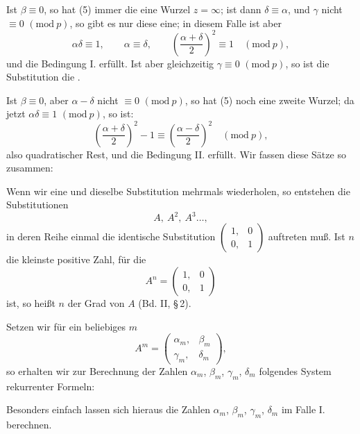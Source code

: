 Ist $\beta \equiv 0$, so hat (5) immer die eine Wurzel $z = \infty$; ist
dann $\delta \equiv \alpha$, und $\gamma$ nicht $\equiv 0$ $(\mathrm{mod}\ p)$, so gibt es nur diese
eine; in diesem Falle ist aber
\[
\alpha\delta \equiv 1, \qquad \alpha \equiv \delta, \qquad \left(\frac{\alpha+\delta}{2}\right)^2 \equiv 1 \quad (\mathrm{mod}\ p),
\]
und die Bedingung I. erfüllt. Ist aber gleichzeitig $\gamma \equiv 0$ $(\mathrm{mod}\ p)$,
so ist die Substitution die .

Ist $\beta \equiv 0$, aber $\alpha-\delta$ nicht $\equiv 0$ $(\mathrm{mod}\ p)$, so hat (5) noch
eine zweite Wurzel; da jetzt $\alpha\delta \equiv 1$ $(\mathrm{mod}\ p)$, so ist:
\[
\left(\frac{\alpha+\delta}{2}\right)^2 - 1 \equiv \left(\frac{\alpha-\delta}{2}\right)^2 \quad (\mathrm{mod}\ p),
\]
also quadratischer Rest, und die Bedingung II. erfüllt. Wir
fassen diese Sätze so zusammen:


Wenn wir eine und dieselbe Substitution
mehrmals wiederholen, so entstehen die Substitutionen
\[
A, \ A^2, \ A^3 \dots,
\]
in deren Reihe einmal die identische Substitution $\begin{pmatrix}1, & 0 \\ 0, & 1\end{pmatrix}$
auftreten muß. Ist $n$ die kleinste positive Zahl, für die
\[
A^n = \begin{pmatrix}1, & 0 \\ 0, & 1\end{pmatrix}
\]
ist, so heißt $n$ der Grad von $A$ (Bd. II, \S\,2).

Setzen wir für ein beliebiges $m$
\[
A^m = \begin{pmatrix}\alpha_m, & \beta_m \\ \gamma_m, & \delta_m\end{pmatrix},
\]
so erhalten wir zur Berechnung der Zahlen $\alpha_m$, $\beta_m$, $\gamma_m$,
$\delta_m$ folgendes System rekurrenter Formeln:

Besonders einfach lassen sich hieraus die Zahlen $\alpha_m$, $\beta_m$,
$\gamma_m$, $\delta_m$ im Falle I. berechnen.
